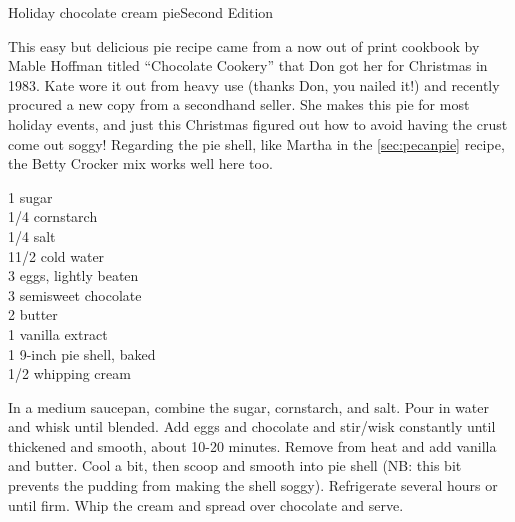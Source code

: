 \begin{entry}{Holiday chocolate cream pie}{Second Edition}

\begin{open}
  This easy but delicious pie recipe came from a now out of print cookbook by
  Mable Hoffman titled ``Chocolate Cookery'' that Don got her for Christmas in
  1983. Kate wore it out from heavy use (thanks Don, you nailed it!) and
  recently procured a new copy from a secondhand seller. She makes this pie
  for most holiday events, and just this Christmas figured out how to avoid
  having the crust come out soggy! Regarding the pie shell, like Martha in the
  \ref{sec:pecanpie} recipe, the Betty Crocker mix works well here too.
\end{open}
\begin{ingredients}
    \SI{1}{\cup} sugar\\
    \SI{1/4}{\cup} cornstarch\\
    \SI{1/4}{\teaspoon} salt\\
    1\SI{1/2}{\cup} cold water\\
    3 eggs, lightly beaten \\
    \SI{3}{\ounce} semisweet chocolate \\
    \SI{2}{\tblspoon} butter \\
    \SI{1}{\teaspoon} vanilla extract\\
    1 9-inch pie shell, baked \\
    \SI{1/2}{\cup} whipping cream
\end{ingredients}
In a medium saucepan, combine the sugar, cornstarch, and salt. Pour in water
and whisk until blended. Add eggs and chocolate and stir/wisk constantly until
thickened and smooth, about 10-20 minutes. Remove from heat and add vanilla
and butter. Cool a bit, then scoop and smooth into pie shell (NB: this bit
prevents the pudding from making the shell soggy). Refrigerate several hours
or until firm. Whip the cream and spread over chocolate and serve.
\end{entry}


